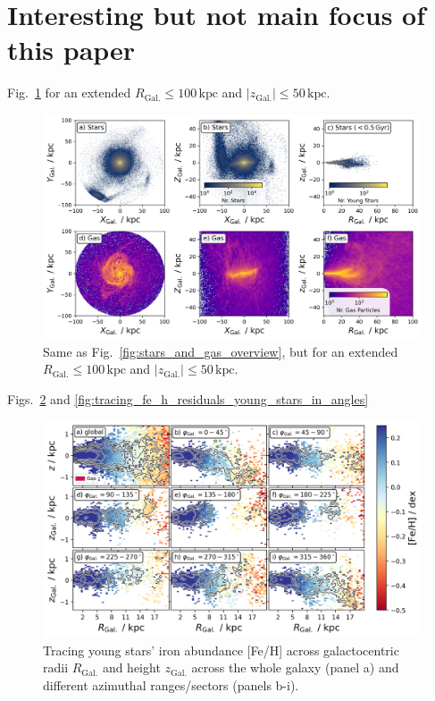 \documentclass[fleqn,usenatbib]{mnras}
\begin{document}

\appendix

\section{Interesting but not main focus of this paper}

Fig.~\ref{fig:stars_and_gas_overview_100kpc} for an extended $R_\mathrm{Gal.} \leq 100\,\mathrm{kpc}$ and $\vert z_\mathrm{Gal.} \vert \leq 50\,\mathrm{kpc}$.

\begin{figure}
    \centering
    \includegraphics[width=\textwidth]{figures/stars_and_gas_overview_100kpc.png}
    \caption{Same as Fig.~\ref{fig:stars_and_gas_overview}, but for an extended $R_\mathrm{Gal.} \leq 100\,\mathrm{kpc}$ and $\vert z_\mathrm{Gal.} \vert \leq 50\,\mathrm{kpc}$.}
    \label{fig:stars_and_gas_overview_100kpc}
\end{figure}

Figs.~\ref{fig:tracing_fe_h_young_stars_in_angles} and \ref{fig:tracing_fe_h_residuals_young_stars_in_angles}

\begin{figure}
    \centering
    \includegraphics[width=\columnwidth]{figures/tracing_fe_h_young_stars_in_angles.png}
    \caption{Tracing young stars' iron abundance [Fe/H] across galactocentric radii $R_\mathrm{Gal.}$ and height $z_\mathrm{Gal.}$ across the whole galaxy (panel a) and different azimuthal ranges/sectors (panels b-i).}
    \label{fig:tracing_fe_h_young_stars_in_angles}
\end{figure}
\end{document}
